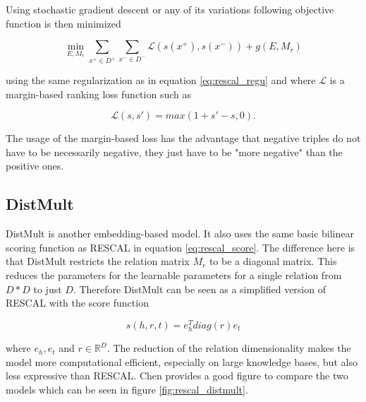 Using stochastic gradient descent or any of its variations following objective function is then minimized 

\begin{equation}
\label{rescal_pairwise}
\min_{E,M_r} \sum_{x^+ \in D^+} \sum_{x^- \in D^-} \mathcal{L}(s(x^+), s(x^-)) + g(E, M_r)
\end{equation}

using the same regularization as in equation \ref{eq:rescal_regu} and where $\mathcal{L}$ is a margin-based ranking loss function such as

\begin{equation}
\label{eq:rescal_loss}
\mathcal{L}(s,s') = max(1+s'-s,0).
\end{equation}
 
The usage of the margin-based loss has the advantage that negative triples do not have to be necessarily negative, they just have to be "more negative" than the positive ones. 

\subsection{DistMult}
\label{cha:distmult}
DistMult \cite{yang_embedding_2015} is another embedding-based model. It also uses the same basic bilinear scoring function as RESCAL in equation \ref{eq:rescal_score}. The difference here is that DistMult restricts the relation matrix $M_r$ to be a diagonal matrix. This reduces the parameters for the learnable parameters for a single relation from $D*D$ to just $D$. Therefore DistMult can be seen as a simplified version of RESCAL with the score function

\begin{equation}
\label{eq:distmult_score}
s(h,r,t)=e_h^T diag(r) e_t
\end{equation}

where $e_h, e_t$ and $r\in \mathbb{R}^D$. The reduction of the relation dimensionality makes the model more computational efficient, especially on large knowledge bases, but also less expressive than RESCAL. Chen \cite{chen_knowledge_2020} provides a good figure to compare the two models which can be seen in figure \ref{fig:rescal_distmult}.

